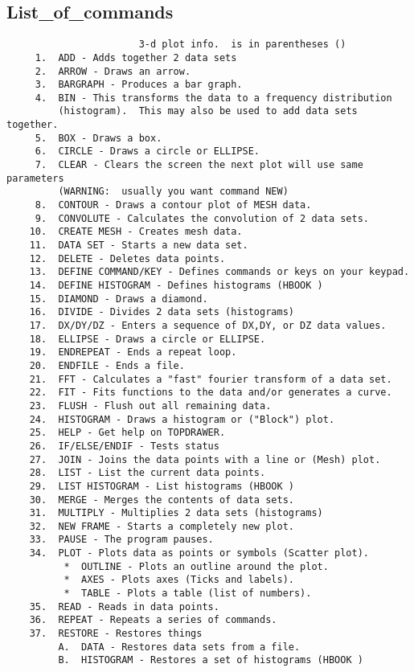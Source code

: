 \subsection{List\_of\_commands}
\begin{verbatim}
                       3-d plot info.  is in parentheses ()
     1.  ADD - Adds together 2 data sets 
     2.  ARROW - Draws an arrow.  
     3.  BARGRAPH - Produces a bar graph.  
     4.  BIN - This transforms the data to a frequency distribution
         (histogram).  This may also be used to add data sets together.  
     5.  BOX - Draws a box.  
     6.  CIRCLE - Draws a circle or ELLIPSE.  
     7.  CLEAR - Clears the screen the next plot will use same parameters
         (WARNING:  usually you want command NEW) 
     8.  CONTOUR - Draws a contour plot of MESH data.  
     9.  CONVOLUTE - Calculates the convolution of 2 data sets.  
    10.  CREATE MESH - Creates mesh data.  
    11.  DATA SET - Starts a new data set.  
    12.  DELETE - Deletes data points.  
    13.  DEFINE COMMAND/KEY - Defines commands or keys on your keypad.  
    14.  DEFINE HISTOGRAM - Defines histograms (HBOOK ) 
    15.  DIAMOND - Draws a diamond.  
    16.  DIVIDE - Divides 2 data sets (histograms) 
    17.  DX/DY/DZ - Enters a sequence of DX,DY, or DZ data values.  
    18.  ELLIPSE - Draws a circle or ELLIPSE.  
    19.  ENDREPEAT - Ends a repeat loop.  
    20.  ENDFILE - Ends a file.  
    21.  FFT - Calculates a "fast" fourier transform of a data set.  
    22.  FIT - Fits functions to the data and/or generates a curve.  
    23.  FLUSH - Flush out all remaining data.  
    24.  HISTOGRAM - Draws a histogram or ("Block") plot.  
    25.  HELP - Get help on TOPDRAWER.  
    26.  IF/ELSE/ENDIF - Tests status 
    27.  JOIN - Joins the data points with a line or (Mesh) plot.  
    28.  LIST - List the current data points.  
    29.  LIST HISTOGRAM - List histograms (HBOOK ) 
    30.  MERGE - Merges the contents of data sets.  
    31.  MULTIPLY - Multiplies 2 data sets (histograms) 
    32.  NEW FRAME - Starts a completely new plot.  
    33.  PAUSE - The program pauses.  
    34.  PLOT - Plots data as points or symbols (Scatter plot).  
          *  OUTLINE - Plots an outline around the plot.  
          *  AXES - Plots axes (Ticks and labels).  
          *  TABLE - Plots a table (list of numbers).  
    35.  READ - Reads in data points.  
    36.  REPEAT - Repeats a series of commands.  
    37.  RESTORE - Restores things 
         A.  DATA - Restores data sets from a file.  
         B.  HISTOGRAM - Restores a set of histograms (HBOOK ) 

\end{verbatim}

